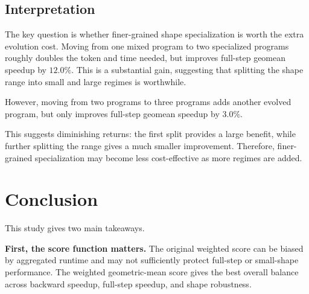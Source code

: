 \documentclass[11pt]{article}
\begin{document}

\subsection{Interpretation}

\noindent
The key question is whether finer-grained shape specialization is worth the extra evolution cost. Moving from one mixed program to two specialized programs roughly doubles the token and time needed, but improves full-step geomean speedup by $12.0\%$. This is a substantial gain, suggesting that splitting the shape range into small and large regimes is worthwhile.

\vspace{0.5em}

\noindent
However, moving from two programs to three programs adds another evolved program, but only improves full-step geomean speedup by $3.0\%.$

\vspace{0.5em}

\noindent
This suggests diminishing returns: the first split provides a large benefit, while further splitting the range gives a much smaller improvement. Therefore, finer-grained specialization may become less cost-effective as more regimes are added.

\vspace{1em}

\section{Conclusion}

\noindent
This study gives two main takeaways.

\vspace{0.5em}

\noindent
\textbf{First, the score function matters.}
The original weighted score can be biased by aggregated runtime and may not sufficiently protect full-step or small-shape performance. The weighted geometric-mean score gives the best overall balance across backward speedup, full-step speedup, and shape robustness.

\vspace{0.5em}
\end{document}
